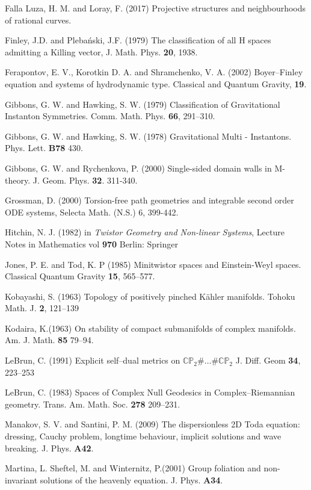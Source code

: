 \begin{thebibliography}{}
 Falla Luza, H. M. and Loray, F. (2017)  Projective structures and neighbourhoods of rational curves.

 Finley, J.D. and Pleba\'nski, J.F. (1979) The classification of all H spaces admitting a Killing
vector, J. Math. Phys. {\bf 20}, 1938.

  Ferapontov, E.  V., Korotkin D. A.  and Shramchenko, V. A. (2002)
Boyer–Finley equation and systems of hydrodynamic type.
Classical and Quantum Gravity, {\bf 19}.

 Gibbons, G. W. and Hawking, S. W. (1979) Classification of Gravitational Instanton Symmetries.
Comm. Math. Phys. {\bf 66}, 291--310.

Gibbons, G. W. and Hawking, S. W. (1978)
Gravitational Multi - Instantons.
Phys. Lett. \textbf{B78}
430.

Gibbons, G. W. and Rychenkova, P. (2000)
Single-sided domain walls in M-theory.
J. Geom. Phys. \textbf{32}. 311-340.

 Grossman, D. (2000) Torsion-free path geometries and integrable second order ODE systems, Selecta
Math. (N.S.) 6, 399-442.

 Hitchin, N. J. (1982) in {\em Twistor Geometry and Non-linear Systems}, Lecture Notes in Mathematics vol {\bf 970} Berlin: Springer

Jones, P. E. and  Tod, K. P (1985)
Minitwistor spaces and Einstein-Weyl spaces. 
Classical Quantum Gravity {\bf 15}, 565--577.

Kobayashi, S. (1963)
Topology of positively pinched K\"ahler manifolds.
Tohoku Math. J. {\bf 2}, 121--139

 Kodaira, K.(1963)
On stability of compact submanifolds of complex manifolds.
Am. J. Math. {\bf 85} 79--94.

 LeBrun, C. (1991)
Explicit self--dual metrics on $\mathbb{CP}_2\#\dots \#\mathbb{CP}_2$
J. Diff. Geom {\bf 34}, 223--253

 LeBrun, C. (1983)
Spaces of Complex Null Geodesics in Complex--Riemannian geometry. Trans. Am. Math. Soc. {\bf 278} 209--231.

 Manakov, S. V. and Santini, P. M. (2009)
The dispersionless 2D Toda equation: dressing, Cauchy problem, longtime behaviour, implicit solutions and wave breaking. J. Phys. {\bf A42}.

Martina, L. Sheftel, M. and Winternitz, P.(2001)
Group foliation and non-invariant
solutions of the heavenly equation.
J. Phys. {\bf A34}.


\end{thebibliography}
